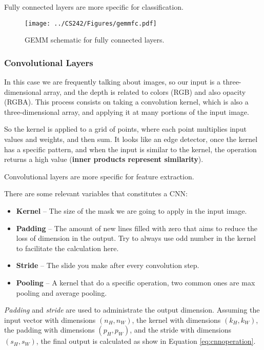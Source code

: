 \documentclass[abstract=true]{scrartcl}
\begin{document}
Fully connected layers are more specific for classification.
\begin{figure}
    \centering
    \texttt{[image: ../CS242/Figures/gemmfc.pdf]}
    \caption{GEMM schematic for fully connected layers.}
    \label{fig:gemmfc}
\end{figure}

\subsubsection{Convolutional Layers}
In this case we are frequently talking about images, so our input is a three-dimensional array, and the depth is related to colors (RGB) and also opacity (RGBA).
This process consists on taking a convolution kernel, which is also a three-dimensional array, and applying it at many portions of the input image. 

So the kernel is applied to a grid of points, where each point multiplies input values and weights, and then sum.
It looks like an edge detector, once the kernel has a specific pattern, and when the input is similar to the kernel, the operation returns a high value (\textbf{inner products represent similarity}).

Convolutional layers are more specific for feature extraction.

There are some relevant variables that constitutes a CNN:

\begin{itemize}
    \item \textbf{Kernel} -- The size of the mask we are going to apply in the input image.
    \item \textbf{Padding} -- The amount of new lines filled with zero that aims to reduce the loss of dimension in the output. Try to always use odd number in the kernel to facilitate the calculation here. 
    \item \textbf{Stride} -- The slide you make after every convolution step.
    \item \textbf{Pooling} -- A kernel that do a specific operation, two common ones are max pooling and average pooling.
\end{itemize}

\emph{Padding} and \emph{stride} are used to administrate the output dimension. Assuming the input vector with dimensions $(n_H, n_W)$, the kernel with dimensions $(k_H, k_W)$, the padding with dimensions $(p_H, p_W)$, and the stride with dimensions $(s_H, s_W)$, the final output is calculated as show in Equation \ref{eq:cnnoperation}.
\end{document}
